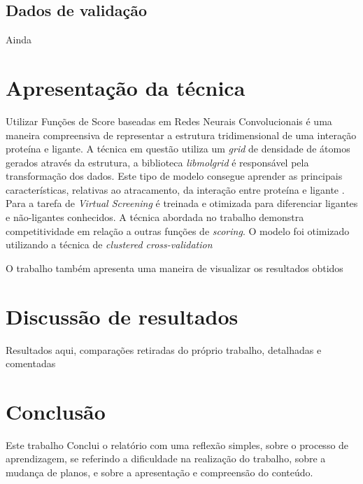 \documentclass[utf8]{frontiersSCNS} %
\begin{document}
\subsection{Dados de validação}

Ainda 

\section{Apresentação da técnica}

Utilizar Funções de Score baseadas em Redes Neurais Convolucionais é uma maneira compreensiva de representar a estrutura tridimensional de uma interação proteína e ligante. A técnica em questão utiliza um \textit{grid} de densidade de átomos \cite{plscnn} gerados através da estrutura, a biblioteca \textit{libmolgrid} \cite{sunseri2019libmolgridgpuacceleratedmolecular} é responsável pela transformação dos dados. Este tipo de modelo consegue aprender as principais características, relativas ao atracamento, da interação entre proteína e ligante \cite{plscnn}. Para a tarefa de \textit{Virtual Screening} é treinada e otimizada para diferenciar ligantes e não-ligantes conhecidos. A técnica abordada no trabalho demonstra competitividade em relação a outras funções de \textit{scoring}.
O modelo foi otimizado utilizando a técnica de \textit{clustered cross-validation}

O trabalho também apresenta uma maneira de visualizar os resultados obtidos  


\section{Discussão de resultados}
Resultados aqui, comparações retiradas do próprio trabalho, detalhadas e comentadas


\section{Conclusão}

Este trabalho 
Conclui o relatório com uma reflexão simples, sobre o processo de aprendizagem, se referindo a dificuldade na realização do trabalho, sobre a mudança de planos, e sobre a apresentação e compreensão do conteúdo. 


\end{document}
